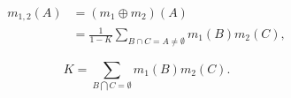 {%

\begin{equation}
\begin{split}
\label{eq:DS_combo}
m_{1,2}(A) &=(m_{1}\oplus m_{2})(A)\\
                   &=\frac{1}{1-K} \sum_{B\cap C=A\neq\emptyset} m_{1}(B)m_{2}(C),
\end{split}
\end{equation}

\begin{equation}
\label{eq:K}
K=\sum_{B\bigcap C=\emptyset}m_{1}(B)m_{2}(C).
\end{equation}



}
